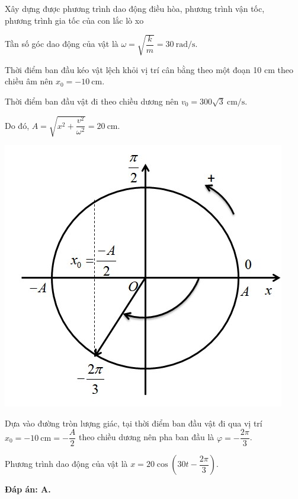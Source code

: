 \begin{dang}{Xây dựng được phương trình dao động điều hòa, phương trình vận tốc,\\ phương trình gia tốc của con lắc lò xo}
{		Tần số góc dao động của vật là $ \omega = \sqrt {\dfrac {k}{m}}=30\ \text{rad/s}$.
		
		Thời điểm ban đầu kéo vật lệch khỏi vị trí cân bằng theo một đoạn 10 cm theo chiều âm nên $x_0=-10\ \text{cm}$.
		
		Thời điểm ban đầu vật đi theo chiều dương nên $v_0=300\sqrt{3}\ \text{cm/s}$. 
		
		Do đó, $A=\sqrt{x^2+\dfrac{v^2}{\omega^2}}=20\ \text{cm}$.
		
		\begin{center}
			\includegraphics[scale=0.5]{../figs/VN12-PH-03-A-002-1-V2-2.jpg}
		\end{center}
		
		Dựa vào đường tròn lượng giác, tại thời điểm ban đầu vật đi qua vị trí $x_0=-10\ \text{cm}=-\dfrac{A}{2}$ theo chiều dương nên pha ban đầu là $\varphi=-\dfrac{2\pi}{3}$.
		
		Phương trình dao động của vật là $x=20\cos \left( 30t-\dfrac{2\pi}{3}\right)$.
		
		\textbf{Đáp án: A.}
	}
\end{dang}


